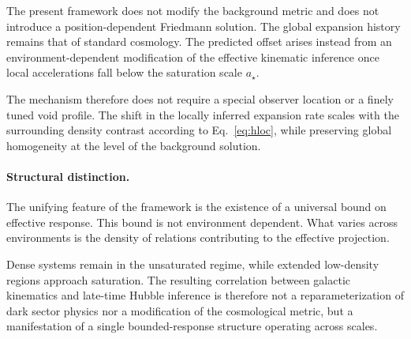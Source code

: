     The present framework does not modify the background metric
    and does not introduce a position-dependent Friedmann solution.
    The global expansion history remains that of standard cosmology.
    The predicted offset arises instead from an environment-dependent
    modification of the effective kinematic inference once local
    accelerations fall below the saturation scale $a_\star$.

    The mechanism therefore does not require a special observer
    location or a finely tuned void profile.
    The shift in the locally inferred expansion rate scales with
    the surrounding density contrast according to
    Eq.~\eqref{eq:hloc}, while preserving global homogeneity
    at the level of the background solution.

  \paragraph{Structural distinction.}

    The unifying feature of the framework is the existence of a
    universal bound on effective response.
    This bound is not environment dependent.
    What varies across environments is the density of relations
    contributing to the effective projection.

    Dense systems remain in the unsaturated regime,
    while extended low-density regions approach saturation.
    The resulting correlation between galactic kinematics and
    late-time Hubble inference is therefore not a reparameterization
    of dark sector physics nor a modification of the cosmological metric,
    but a manifestation of a single bounded-response structure
    operating across scales.
